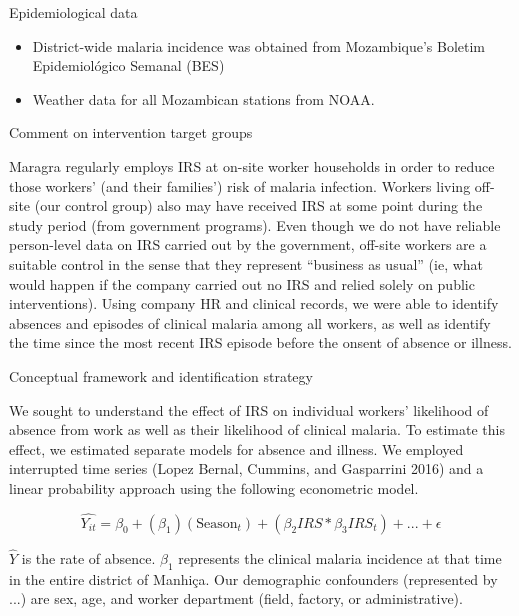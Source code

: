 \documentclass[ignorenonframetext,]{beamer}
\providecommand{\tightlist}{%
  \setlength{\itemsep}{0pt}\setlength{\parskip}{0pt}}
\begin{document}
\begin{frame}{Epidemiological data}

\begin{itemize}
\tightlist
\item
  District-wide malaria incidence was obtained from Mozambique's Boletim
  Epidemiológico Semanal (BES)\\
\item
  Weather data for all Mozambican stations from NOAA.
\end{itemize}

\end{frame}

\begin{frame}{Comment on intervention target groups}

Maragra regularly employs IRS at on-site worker households in order to
reduce those workers' (and their families') risk of malaria infection.
Workers living off-site (our control group) also may have received IRS
at some point during the study period (from government programs). Even
though we do not have reliable person-level data on IRS carried out by
the government, off-site workers are a suitable control in the sense
that they represent ``business as usual'' (ie, what would happen if the
company carried out no IRS and relied solely on public interventions).
Using company HR and clinical records, we were able to identify absences
and episodes of clinical malaria among all workers, as well as identify
the time since the most recent IRS episode before the onsent of absence
or illness.

\end{frame}

\begin{frame}{Conceptual framework and identification strategy}

We sought to understand the effect of IRS on individual workers'
likelihood of absence from work as well as their likelihood of clinical
malaria. To estimate this effect, we estimated separate models for
absence and illness. We employed interrupted time series (Lopez Bernal,
Cummins, and Gasparrini 2016) and a linear probability approach using
the following econometric model.

\[
\hat{Y_{it}} = \beta_{0} +  (\beta_{1}) (\text{Season}_{t}) + (\beta_2{IRS}*\beta_3{IRS_t}) + ... + \epsilon
\]

\(\hat{Y}\) is the rate of absence. \(\beta_{1}\) represents the
clinical malaria incidence at that time in the entire district of
Manhiça. Our demographic confounders (represented by \(...\)) are sex,
age, and worker department (field, factory, or administrative).

\end{frame}
\end{document}
